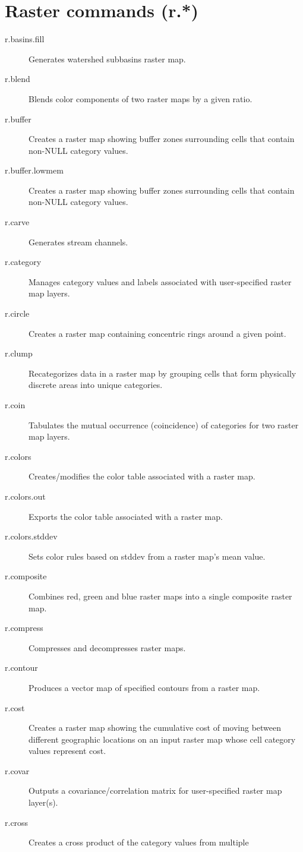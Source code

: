 
\section{Raster commands (r.{*})}
\begin{description}
\item [{r.basins.fill}] Generates watershed subbasins raster map.
\item [{r.blend}] Blends color components of two raster maps by a given
ratio.
\item [{r.buffer}] Creates a raster map showing buffer zones surrounding
cells that contain non-NULL category values.
\item [{r.buffer.lowmem}] Creates a raster map showing buffer zones surrounding
cells that contain non-NULL category values.
\item [{r.carve}] Generates stream channels.
\item [{r.category}] Manages category values and labels associated with
user-specified raster map layers.
\item [{r.circle}] Creates a raster map containing concentric rings around
a given point.
\item [{r.clump}] Recategorizes data in a raster map by grouping cells
that form physically discrete areas into unique categories.
\item [{r.coin}] Tabulates the mutual occurrence (coincidence) of categories
for two raster map layers.
\item [{r.colors}] Creates/modifies the color table associated with a raster
map.
\item [{r.colors.out}] Exports the color table associated with a raster
map.
\item [{r.colors.stddev}] Sets color rules based on stddev from a raster
map's mean value.
\item [{r.composite}] Combines red, green and blue raster maps into a single
composite raster map.
\item [{r.compress}] Compresses and decompresses raster maps.
\item [{r.contour}] Produces a vector map of specified contours from a
raster map.
\item [{r.cost}] Creates a raster map showing the cumulative cost of moving
between different geographic locations on an input raster map whose
cell category values represent cost.
\item [{r.covar}] Outputs a covariance/correlation matrix for user-specified
raster map layer(s).
\item [{r.cross}] Creates a cross product of the category values from multiple

\end{description}
